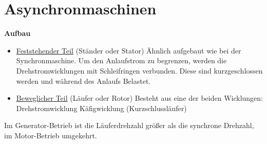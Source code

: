 \section{Asynchronmaschinen}


\textbf{Aufbau}

\begin{itemize}
    \item \underline{Feststehender Teil} (Ständer oder Stator)
    \newline Ähnlich aufgebaut wie bei der Synchronmaschine.
    \newline Um den Anlaufstrom zu begrenzen, werden die Drehstromwicklungen mit Schleifringen verbunden. Diese sind kurzgeschlossen werden und während des Anlaufs Belastet.
    \item \underline{Beweglicher Teil} (Läufer oder Rotor)
    \newline Besteht aus eine der beiden Wicklungen:
    \subitem Drehstromwicklung
    \subitem Käfigwicklung (Kurzschlussläufer)
\end{itemize}

Im Generator-Betrieb ist die Läuferdrehzahl größer als die synchrone Drehzahl, im Motor-Betrieb umgekehrt.
